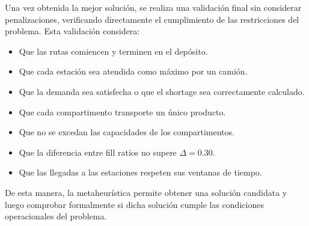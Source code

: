 Una vez obtenida la mejor solución, se realiza una validación final sin considerar penalizaciones, verificando directamente el cumplimiento de las restricciones del problema. Esta validación considera:

\begin{itemize}
    \item Que las rutas comiencen y terminen en el depósito.
    \item Que cada estación sea atendida como máximo por un camión.
    \item Que la demanda sea satisfecha o que el shortage sea correctamente calculado.
    \item Que cada compartimento transporte un único producto.
    \item Que no se excedan las capacidades de los compartimentos.
    \item Que la diferencia entre fill ratios no supere $\Delta = 0.30$.
    \item Que las llegadas a las estaciones respeten sus ventanas de tiempo.
\end{itemize}

De esta manera, la metaheurística permite obtener una solución candidata y luego comprobar formalmente si dicha solución cumple las condiciones operacionales del problema.

